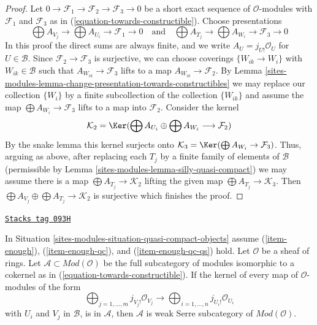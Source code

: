 \begin{proof}
Let $0 \to \mathcal{F}_1 \to \mathcal{F}_2 \to \mathcal{F}_3 \to 0$
be a short exact sequence of $\mathcal{O}$-modules with
$\mathcal{F}_1$ and $\mathcal{F}_3$ as in
(\ref{equation-towards-constructible}). Choose presentations
$$
\bigoplus A_{V_j} \to \bigoplus A_{U_i} \to \mathcal{F}_1 \to 0
\quad\text{and}\quad
\bigoplus A_{T_j} \to \bigoplus A_{W_i} \to \mathcal{F}_3 \to 0
$$
In this proof the direct sums are always finite, and
we write $A_U = j_{U!}\mathcal{O}_U$ for $U \in \mathcal{B}$.
Since $\mathcal{F}_2 \to \mathcal{F}_3$ is surjective, we can
choose coverings $\{W_{ik} \to W_i\}$ with $W_{ik} \in \mathcal{B}$
such that $A_{W_{ik}} \to \mathcal{F}_3$ lifts to a map
$A_{W_{ik}} \to \mathcal{F}_2$.
By Lemma \ref{sites-modules-lemma-change-presentation-towards-constructibles}
we may replace our collection $\{W_i\}$ by a finite subcollection
of the collection $\{W_{ik}\}$ and assume the map
$\bigoplus A_{W_i} \to \mathcal{F}_3$ lifts to a map into $\mathcal{F}_2$.
Consider the kernel
$$
\mathcal{K}_2 = \Ker(\bigoplus A_{U_i} \oplus \bigoplus A_{W_i}
\longrightarrow \mathcal{F}_2)
$$
By the snake lemma this kernel surjects onto
$\mathcal{K}_3 = \Ker(\bigoplus A_{W_i} \to \mathcal{F}_3)$.
Thus, arguing as above, after replacing each $T_j$ by a finite family of
elements of $\mathcal{B}$ (permissible by
Lemma \ref{sites-modules-lemma-silly-quasi-compact})
we may assume there is a map
$\bigoplus A_{T_j} \to \mathcal{K}_2$ lifting the given map
$\bigoplus A_{T_j} \to \mathcal{K}_3$.
Then $\bigoplus A_{V_j} \oplus \bigoplus A_{T_j} \to \mathcal{K}_2$
is surjective which finishes the proof.
\end{proof}

\begin{lemma}
\label{sites-modules-lemma-towards-constructible-when-serre-subcategory}
\href{https://stacks.math.columbia.edu/tag/093H}{\texttt{Stacks tag 093H}}

In Situation \ref{sites-modules-situation-quasi-compact-objects} assume
(\ref{item-enough}), (\ref{item-enough-qc}), and (\ref{item-enough-qc-qs})
hold. Let $\mathcal{O}$ be a sheaf of rings.
Let $\mathcal{A} \subset \textit{Mod}(\mathcal{O})$ be the full
subcategory of modules isomorphic to a cokernel as in
(\ref{equation-towards-constructible}).
If the kernel of every map of $\mathcal{O}$-modules of the form
$$
\bigoplus\nolimits_{j = 1, \ldots, m} j_{V_j!}\mathcal{O}_{V_j}
\longrightarrow
\bigoplus\nolimits_{i = 1, \ldots, n} j_{U_i!}\mathcal{O}_{U_i}
$$
with $U_i$ and $V_j$ in $\mathcal{B}$, is in $\mathcal{A}$, then
$\mathcal{A}$ is weak Serre subcategory of $\textit{Mod}(\mathcal{O})$.
\end{lemma}

